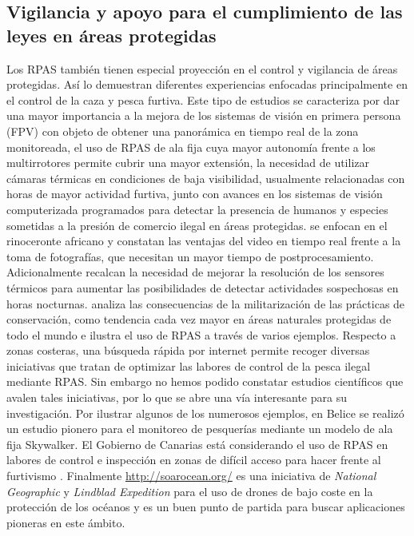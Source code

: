 \documentclass[onecolumn]{extarticle}
\begin{document}
\subsection{Vigilancia y apoyo para el cumplimiento de las leyes en
áreas
protegidas}\label{vigilancia-y-apoyo-para-el-cumplimiento-de-las-leyes-en-areas-protegidas}

Los RPAS también tienen especial proyección en el control y vigilancia
de áreas protegidas. Así lo demuestran diferentes experiencias enfocadas
principalmente en el control de la caza y pesca furtiva. Este tipo de
estudios se caracteriza por dar una mayor importancia a la mejora de los
sistemas de visión en primera persona (FPV) con objeto de obtener una
panorámica en tiempo real de la zona monitoreada, el uso de RPAS de ala
fija cuya mayor autonomía frente a los multirrotores permite cubrir una
mayor extensión, la necesidad de utilizar cámaras térmicas en
condiciones de baja visibilidad, usualmente relacionadas con horas de
mayor actividad furtiva, junto con avances en los sistemas de visión
computerizada programados para detectar la presencia de humanos y
especies sometidas a la presión de comercio ilegal en áreas protegidas.
\citep{Mulero-Pazmany2014} se enfocan en el rinoceronte africano y
constatan las ventajas del video en tiempo real frente a la toma de
fotografías, que necesitan un mayor tiempo de postprocesamiento.
Adicionalmente recalcan la necesidad de mejorar la resolución de los
sensores térmicos para aumentar las posibilidades de detectar
actividades sospechosas en horas nocturnas. \citep{Duffy2014} analiza
las consecuencias de la militarización de las prácticas de conservación,
como tendencia cada vez mayor en áreas naturales protegidas de todo el
mundo e ilustra el uso de RPAS a través de varios ejemplos. Respecto a
zonas costeras, una búsqueda rápida por internet permite recoger
diversas iniciativas que tratan de optimizar las labores de control de
la pesca ilegal mediante RPAS. Sin embargo no hemos podido constatar
estudios científicos que avalen tales iniciativas, por lo que se abre
una vía interesante para su investigación. Por ilustrar algunos de los
numerosos ejemplos, en Belice se realizó un estudio pionero para el
monitoreo de pesquerías mediante un modelo de ala fija Skywalker. El
Gobierno de Canarias está considerando el uso de RPAS en labores de
control e inspección en zonas de difícil acceso para hacer frente al
furtivismo \citep{Canarias2017}. Finalmente \url{http://soarocean.org/}
es una iniciativa de \emph{National Geographic} y \emph{Lindblad
Expedition} para el uso de drones de bajo coste en la protección de los
océanos y es un buen punto de partida para buscar aplicaciones pioneras
en este ámbito.
\end{document}
